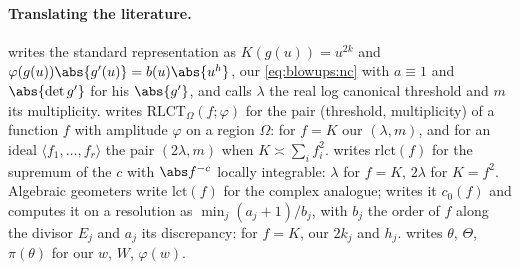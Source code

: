 \begin{refsection}
\paragraph{Translating the literature.} \Textcite{Watanabe2013} writes the standard representation as $K(g(u))=u^{2k}$ and $\varphi(g(u))\abs{g'(u)}=b(u)\abs{u^h}$, our \eqref{eq:blowups:nc} with $a\equiv1$ and $\abs{\det g'}$ for his $\abs{g'}$, and calls $\lambda$ the real log canonical threshold and $m$ its multiplicity. \Textcite{Lin2011,Lin2017} writes $\mathrm{RLCT}_\Omega(f;\varphi)$ for the pair (threshold, multiplicity) of a function $f$ with amplitude $\varphi$ on a region $\Omega$: for $f=K$ our $(\lambda,m)$, and for an ideal $\langle f_1,\dots,f_r\rangle$ the pair $(2\lambda,m)$ when $K\asymp\sum_if_i^2$. \Textcite{Saito2007} writes $\mathrm{rlct}(f)$ for the supremum of the $c$ with $\abs f^{-c}$ locally integrable: $\lambda$ for $f=K$, $2\lambda$ for $K=f^2$. Algebraic geometers write $\mathrm{lct}(f)$ for the complex analogue; \textcite{Kollar1997} writes it $c_0(f)$ and computes it on a resolution as $\min_j(a_j+1)/b_j$, with $b_j$ the order of $f$ along the divisor $E_j$ and $a_j$ its discrepancy: for $f=K$, our $2k_j$ and $h_j$. \Textcite{Watanabe2024} writes $\theta$, $\Theta$, $\pi(\theta)$ for our $w$, $W$, $\varphi(w)$.

\printchapterbib
\end{refsection}
